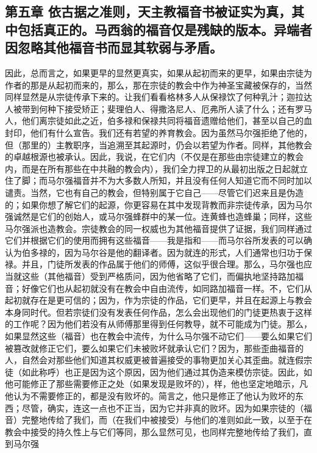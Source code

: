 
\subsection{第五章 依古据之准则，天主教福音书被证实为真，其中包括真正的。马西翁的福音仅是残缺的版本。异端者因忽略其他福音书而显其软弱与矛盾。}

因此，总而言之，如果更早的显然更真实，如果从起初而来的更早，如果由宗徒为作者的那是从起初而来的，那么，那在宗徒的教会中作为神圣宝藏被保存的，当然同样显然是从宗徒传承下来的。让我们看看格林多人从保禄饮了何种乳汁；迦拉达人被带到何种下接受矫正；斐理伯人、得撒洛尼人、厄弗所人读了什么；还有罗马人，他们离宗徒如此之近，伯多禄和保禄共同将福音遗赠给他们，甚至以自己的血封印，他们有什么宣告。我们还有若望的养育教会。因为虽然马尔强拒绝了他的，但（那里的）主教职序，当追溯至其起源时，仍会以若望为作者。同样，其他教会的卓越根源也被承认。因此，我说，在它们内（不仅是在那些由宗徒建立的教会内，而是在所有那些在中共融的教会内），我们全力捍卫的从最初出版之日起就立住了脚；而马尔强福音并不为大多数人所知，并且没有任何人知道它而不同时加以谴责。当然，它也有自己的教会，但特别属于它自己——尽管它们迟来且是伪造的；如果你想了解它们的起源，你更容易在其中发现背教而非宗徒传承，因为马尔强诚然是它们的创始人，或马尔强蜂群中的某一位。连黄蜂也造蜂巢；同样，这些马尔强派也造教会。宗徒教会的同一权威也为其他福音提供了证据，我们同样通过它们并根据它们的使用而拥有这些福音——我是指和——而马尔谷所发表的可以确认为伯多禄的，因为马尔谷是他的翻译者。因为就连的形式，人们通常也归功于保禄。并且，门徒所发表的作品属于他们的师傅，这似乎很合理。那么，马尔强也应当就这些（其他福音）受到严格质问，因为他省略了它们，而偏执地坚持路加福音；好像它们也从起初就没有在教会中自由流传，如同路加福音一样。不，它们从起初就存在是更可信的；因为，作为宗徒的作品，它们更早，并且在起源上与教会本身同时代。但若宗徒们没有发表任何作品，怎么会出现他们的门徒更热衷于这样的工作呢？因为他们若没有从师傅那里得到任何教导，就不可能成为门徒。那么，如果显然这些（福音）也在教会中流传，为什么马尔强不动它们——要么如果它们被篡改就修正它们，要么如果它们未被败坏就承认它们？因为，那些歪曲福音的人，自然会对那些他们知道其权威更被普遍接受的事物更加关心其歪曲。就连假宗徒（如此称呼）也正是因为这个原因，因为他们通过其伪造来模仿宗徒。因此，如他可能修正了那些需要修正之处（如果发现是败坏的），样，他也坚定地暗示，凡他认为不需要修正的，都是没有败坏的。简言之，他只是修正了他认为败坏的东西；尽管，确实，连这一点也不正当，因为它并非真的败坏。因为如果宗徒的（福音）完整地传给了我们，而（在我们中被接受）与他们的准则如此一致，以至于在教会中接受的持久性上与它们等同，那么显然可见，也同样完整地传给了我们，直到马尔强